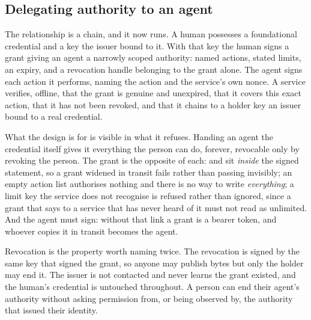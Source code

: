 \subsection{Delegating authority to an agent}


The relationship is a chain, and it now runs. A human possesses a foundational credential and a key
the issuer bound to it. With that key the human signs a grant giving an agent a narrowly scoped
authority: named actions, stated limits, an expiry, and a revocation handle belonging to the grant
alone. The agent signs each action it performs, naming the action and the service's own nonce. A
service verifies, offline, that the grant is genuine and unexpired, that it covers this exact action,
that it has not been revoked, and that it chains to a holder key an issuer bound to a real
credential. \sImpl

What the design is for is visible in what it refuses. Handing an agent the credential itself gives it
everything the person can do, forever, revocable only by revoking the person. The grant is the
opposite of each:  and  sit \emph{inside} the signed statement, so a
grant widened in transit fails rather than passing invisibly; an empty action list authorises nothing
and there is no way to write \emph{everything}; a limit key the service does not recognise is
refused rather than ignored, since a grant that says  to a service that has
never heard of it must not read as unlimited. And the agent must sign: without that link a grant is a
bearer token, and whoever copies it in transit becomes the agent.

Revocation is the property worth naming twice. The revocation is signed by the same key that signed
the grant, so anyone may publish bytes but only the holder may end it. The issuer is not contacted
and never learns the grant existed, and the human's credential is untouched throughout. A person can
end their agent's authority without asking permission from, or being observed by, the authority that
issued their identity.

